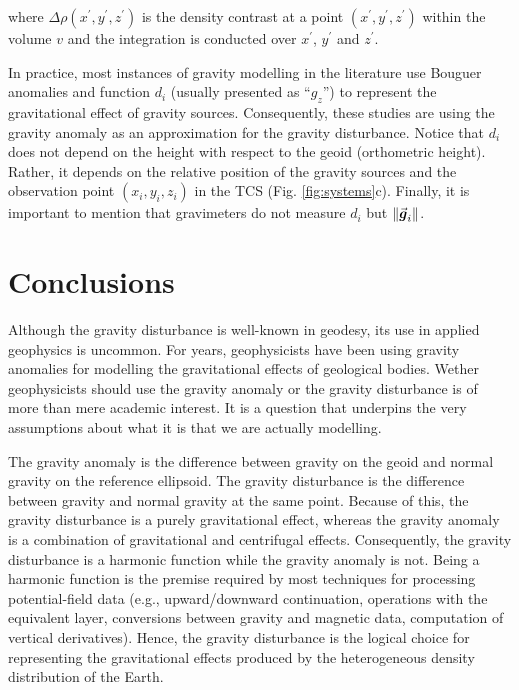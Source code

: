 \documentclass[extra]{gji}
\renewcommand{\vector}[1]{\vec{\mitbf{#1}}}
\begin{document}
\noindent
where $\Delta\rho(x^{\prime}, y^{\prime}, z^{\prime})$
is the density contrast at a point $(x^{\prime}, y^{\prime}, z^{\prime})$
within the volume $v$ and the integration is conducted over $x^{\prime}$,
$y^{\prime}$ and $z^{\prime}$.

In practice, most instances of gravity modelling in the literature use Bouguer
anomalies and function $d_{i}$ (usually presented as ``$g_z$'') to represent
the gravitational effect of gravity sources.
Consequently, these studies are using the gravity
anomaly as an approximation for the gravity disturbance.
Notice that $d_{i}$ does not depend on the
height with respect to the geoid (orthometric height).
Rather, it depends on the relative position of the gravity sources and the
observation point $(x_{i}, y_{i}, z_{i})$ in the TCS (Fig. \ref{fig:systems}c).
Finally, it is important to mention that gravimeters do not measure $d_{i}$ but
$\| \vector{g}_i \|$.


\section{Conclusions}

Although the gravity disturbance is well-known in geodesy,
its use in applied geophysics is uncommon.
For years, geophysicists have been using gravity anomalies for modelling
the gravitational effects of geological bodies.
Wether geophysicists should use the gravity anomaly or the gravity disturbance
is of more than mere academic interest.
It is a question that underpins the very assumptions about what it is that we
are actually modelling.

The gravity anomaly is the difference between
gravity on the geoid and normal gravity on the reference ellipsoid.
The gravity disturbance is the difference between gravity and normal gravity at
the same point.
Because of this, the gravity disturbance is a purely gravitational effect,
whereas the gravity anomaly is a combination of gravitational and centrifugal
effects.
Consequently, the gravity disturbance is a harmonic function while the
gravity anomaly is not.
Being a harmonic function is the premise required by most techniques for
processing potential-field data
(e.g., upward/downward continuation, operations with the equivalent layer,
conversions between gravity and magnetic data, computation of vertical
derivatives).
Hence, the gravity disturbance is the logical choice for
representing the gravitational effects produced by the heterogeneous density
distribution of the Earth.
\end{document}
